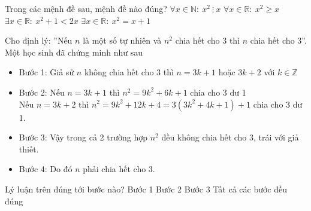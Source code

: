 \begin{ex}%
	 Trong các mệnh đề sau, mệnh đề nào đúng?
	\choice 
		 {$\forall x\in \mathbb{N}:\ x^2\ \vdots\ x$}
		{$\forall x\in  \mathbb{R}:\ x^2\geq x$}
		{$\exists  x\in \mathbb{R}:\ x^2+1<2x$}
		{\True $\exists x\in  \mathbb{R}:\ x^2=x+1$}
\end{ex}

\begin{ex}%
	Cho định lý: ''Nếu $n$  là một số tự nhiên và $n^2$ chia hết cho $3$ thì $n$ chia hết cho $3$''. Một học sinh đã chứng minh như sau
	\begin{itemize}
		\item Bước 1: Giả sử $n$ không chia hết cho $3$ thì $n= 3k+1$  hoặc $3k+2$ với $k\in \mathbb{Z} $
		\item Bước 2: Nếu $n=3k+1$ thì $n^2=9k^2+6k+1$ chia cho  $3$ dư 1\\
		 Nếu $n=3k+2$ thì $n^2=9k^2+12k+4=3\left(3k^2+4k+1\right)+1$ chia cho $3$ dư $1$.
		\item Bước 3: Vậy trong cả 2 trường hợp $n^2$ đều không chia hết cho $3$,  trái với giả thiết.
		\item Bước 4: Do đó  $n$ phải chia hết cho $3$.
	\end{itemize}
	Lý luận trên đúng tới bước  nào?
	\choice 
		{Bước  1}
		{Bước 2} 
		{Bước 3} 
		{\True Tất  cả các bước đều đúng}
\end{ex}

